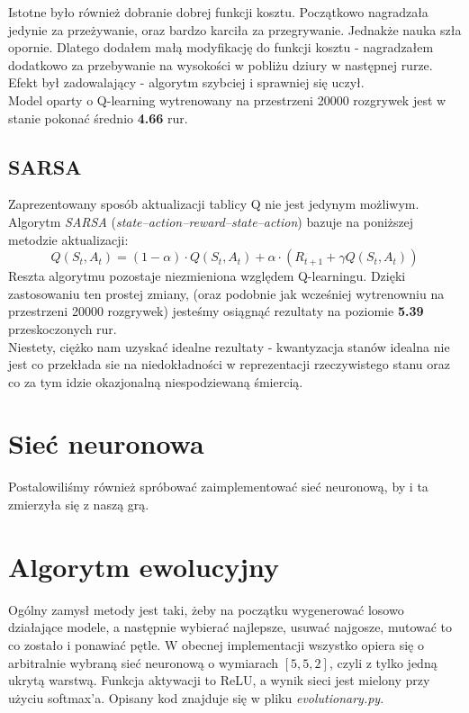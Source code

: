 \documentclass[12pt, A4]{article}
\begin{document}
	Istotne było również dobranie dobrej funkcji kosztu. Początkowo nagradzała jedynie za przeżywanie, oraz bardzo karciła za przegrywanie. Jednakże nauka szła opornie. Dlatego dodałem małą modyfikację do funkcji kosztu - nagradzałem dodatkowo za przebywanie na wysokości w pobliżu dziury w następnej rurze. Efekt był zadowalający - algorytm szybciej i sprawniej się uczył. \\
	Model oparty o Q-learning wytrenowany na przestrzeni 20000 rozgrywek jest w stanie pokonać średnio \textbf{4.66} rur.

	\subsection{SARSA}
	Zaprezentowany sposób aktualizacji tablicy Q nie jest jedynym możliwym. Algorytm \textit{SARSA} (\textit{state–action–reward–state–action}) bazuje na poniższej metodzie aktualizacji:
	\[	Q(S_t, A_t) = (1-\alpha)\cdot Q(S_t, A_t) + \alpha \cdot \left( R_{t+1} + \gamma Q(S_t, A_t) \right)	\]
	Reszta algorytmu pozostaje niezmieniona względem Q-learningu. Dzięki zastosowaniu ten prostej zmiany, (oraz podobnie jak wcześniej wytrenowniu na przestrzeni 20000 rozgrywek) jesteśmy osiągnąć rezultaty na poziomie \textbf{5.39} przeskoczonych rur.\\

	Niestety, ciężko nam uzyskać idealne rezultaty - kwantyzacja stanów idealna nie jest co przekłada sie na niedokładności w reprezentacji rzeczywistego stanu oraz co za tym idzie okazjonalną niespodziewaną śmiercią.
\section{Sieć neuronowa}
Postalowiliśmy również spróbować zaimplementować sieć neuronową, by i ta zmierzyła się z naszą grą. 


\section{Algorytm ewolucyjny}
Ogólny zamysł metody jest taki, żeby na początku wygenerować losowo działające modele, a następnie wybierać najlepsze, usuwać najgosze, mutować to co zostało i ponawiać pętle.
\newline
W obecnej implementacji wszystko opiera się o arbitralnie wybraną sieć neuronową o wymiarach $[5, 5, 2]$, czyli z tylko jedną ukrytą warstwą. Funkcja aktywacji to ReLU, a wynik sieci jest mielony przy użyciu softmax'a. Opisany kod znajduje się w pliku \textit{evolutionary.py}.
\end{document}

